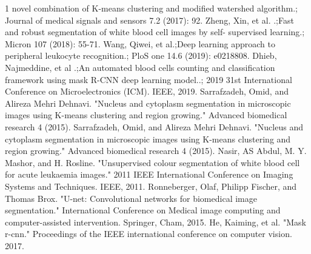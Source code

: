 \documentclass[conference]{IEEEtran}
\begin{document}
\begin{thebibliography}{1}
novel combination of K-means clustering and modified watershed algorithm.; Journal of
medical signals and sensors 7.2 (2017): 92.
Zheng, Xin, et al. .;Fast and robust segmentation of white blood cell images by self-
supervised learning.; Micron 107 (2018): 55-71.
Wang, Qiwei, et al.;Deep learning approach to peripheral leukocyte recognition.; PloS
one 14.6 (2019): e0218808.
Dhieb, Najmeddine, et al .;An automated blood cells counting and classification framework
using mask R-CNN deep learning model..; 2019 31st International Conference on
Microelectronics (ICM). IEEE, 2019.
Sarrafzadeh, Omid, and Alireza Mehri Dehnavi. "Nucleus and cytoplasm segmentation in microscopic images using K-means clustering and region growing." Advanced biomedical research 4 (2015).
Sarrafzadeh, Omid, and Alireza Mehri Dehnavi. "Nucleus and cytoplasm segmentation in microscopic images using K-means clustering and region growing." Advanced biomedical research 4 (2015).
Nasir, AS Abdul, M. Y. Mashor, and H. Rosline. "Unsupervised colour segmentation of white blood cell for acute leukaemia images." 2011 IEEE International Conference on Imaging Systems and Techniques. IEEE, 2011.
Ronneberger, Olaf, Philipp Fischer, and Thomas Brox. "U-net: Convolutional networks for biomedical image segmentation." International Conference on Medical image computing and computer-assisted intervention. Springer, Cham, 2015.
He, Kaiming, et al. "Mask r-cnn." Proceedings of the IEEE international conference on computer vision. 2017.

\end{thebibliography}
\end{document}
